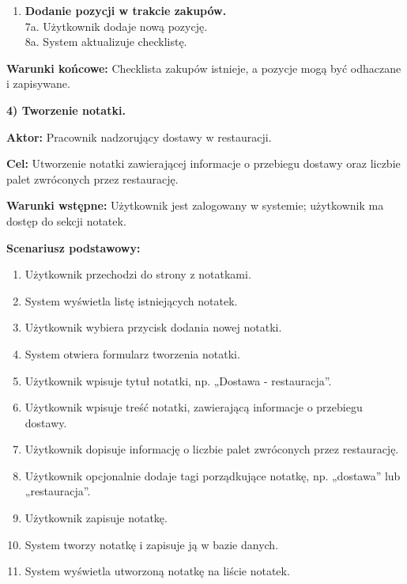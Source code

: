 \documentclass[12pt,a4paper,twoside]{report}
\begin{document}
\begin{enumerate}
\def\labelenumi{\arabic{enumi}.}
\item
  \textbf{Dodanie pozycji w trakcie zakupów.}\\
  7a. Użytkownik dodaje nową pozycję.\\
  8a. System aktualizuje checklistę.
\end{enumerate}

\noindent \textbf{Warunki końcowe:} Checklista zakupów istnieje, a pozycje mogą być odhaczane i zapisywane.

\vspace{\baselineskip}

\noindent \textbf{4) Tworzenie notatki.}

\noindent \textbf{Aktor:} Pracownik nadzorujący dostawy w restauracji.

\noindent \textbf{Cel:} Utworzenie notatki zawierającej informacje o przebiegu dostawy oraz liczbie palet zwróconych przez restaurację.

\noindent \textbf{Warunki wstępne:} Użytkownik jest zalogowany w systemie; użytkownik ma dostęp do sekcji notatek.

\noindent \textbf{Scenariusz podstawowy:}

\begin{enumerate}
\def\labelenumi{\arabic{enumi}.}
\item
  Użytkownik przechodzi do strony z notatkami.
\item
  System wyświetla listę istniejących notatek.
\item
  Użytkownik wybiera przycisk dodania nowej notatki.
\item
  System otwiera formularz tworzenia notatki.
\item
  Użytkownik wpisuje tytuł notatki, np. „Dostawa - restauracja''.
\item
  Użytkownik wpisuje treść notatki, zawierającą informacje o przebiegu dostawy.
\item
  Użytkownik dopisuje informację o liczbie palet zwróconych przez restaurację.
\item
  Użytkownik opcjonalnie dodaje tagi porządkujące notatkę, np. „dostawa'' lub „restauracja''.
\item
  Użytkownik zapisuje notatkę.
\item
  System tworzy notatkę i zapisuje ją w bazie danych.
\item
  System wyświetla utworzoną notatkę na liście notatek.
\end{enumerate}
\end{document}
